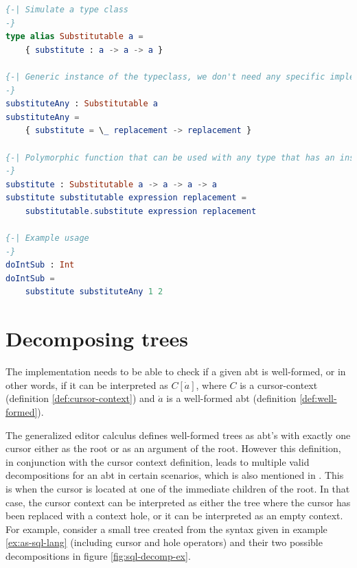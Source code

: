 \documentclass{article}
\begin{document}
\begin{lstlisting}[language=elm,style=inline,caption={Elm typeclass simulation example},label={lst:elm-typeclass}]
{-| Simulate a type class
-}
type alias Substitutable a =
    { substitute : a -> a -> a }

{-| Generic instance of the typeclass, we don't need any specific implementation for each type/sort, we just want to assure that the expression and replacement are of the same type. This is constrained by the `substitute` function signature in the (simulated) typeclass.
-}
substituteAny : Substitutable a
substituteAny =
    { substitute = \_ replacement -> replacement }

{-| Polymorphic function that can be used with any type that has an instance of the `Substitutable` typeclass.
-}
substitute : Substitutable a -> a -> a -> a
substitute substitutable expression replacement =
    substitutable.substitute expression replacement

{-| Example usage
-}
doIntSub : Int
doIntSub =
    substitute substituteAny 1 2
\end{lstlisting}

\section{Decomposing trees}
The implementation needs to be able to check if a given abt is well-formed, or in other words, if it can be interpreted as $C[\dot{a}]$, where $C$ is a cursor-context (definition \ref{def:cursor-context}) and $\dot{a}$ is a well-formed abt (definition \ref{def:well-formed}). 

The generalized editor calculus\cite{aalborg} defines well-formed trees as abt's with exactly one cursor either as the root or as an argument of the root. However this definition, in conjunction with the cursor context definition, leads to multiple valid decompositions for an abt in certain scenarios, which is also mentioned in \cite{aalborg}. This is when the cursor is located at one of the immediate children of the root. In that case, the cursor context can be interpreted as either the tree where the cursor has been replaced with a context hole, or it can be interpreted as an empty context. For example, consider a small tree created from the syntax given in example \ref{ex:as-sql-lang} (including cursor and hole operators) and their two possible decompositions in figure \ref{fig:sql-decomp-ex}.
\end{document}
